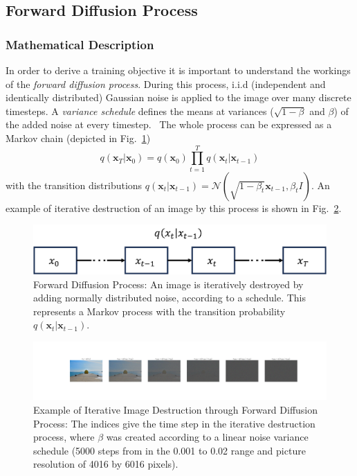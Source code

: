 \subsection{Forward Diffusion Process}
\subsubsection{Mathematical Description}
In order to derive a training objective it is important to understand the workings of the \textit{forward diffusion process}. During this process, i.i.d (independent and identically distributed) Gaussian noise is applied to the image over many discrete timesteps. A \textit{variance schedule} defines the means at variances ($\sqrt{1-\beta}$ and $\beta$) of the added noise at every timestep.~\autocite{ho2020denoising} The whole process can be expressed as a Markov chain (depicted in Fig.~\ref{fig:forward_diffusion})
\begin{equation}
    q(\bm{x}_T|\bm{x}_0) = q(\bm{x}_0) \prod_{t=1}^{T} q(\bm{x}_{t}|\bm{x}_{t-1})
\end{equation}
with the transition distributions $q(\bm{x}_t|\bm{x}_{t-1}) = \mathcal{N}(\sqrt{1-\beta_t} \bm{x}_{t-1}, \beta_t I)$. An example of iterative destruction of an image by this process is shown in Fig.~\ref{fig:forward_naoshima}.

\begin{figure}[h]
    \centering
    \includegraphics[width=.5\textwidth]{images/forward_diffusion.png}
    \caption{Forward Diffusion Process: An image is iteratively destroyed by adding normally distributed noise,
        according to a schedule. This represents a Markov process with the transition probability $q(\bm{x}_t|\bm{x}_{t-1})$.}
    \label{fig:forward_diffusion}
\end{figure}

\begin{figure}[h]
    \centering
    \includegraphics[width=\textwidth]{images/forward_naoshima.png}
    \caption{Example of Iterative Image Destruction through Forward Diffusion Process:
        The indices give the time step in the iterative destruction process, where $\beta$ was created according to a linear noise variance schedule (5000 steps from in the 0.001 to 0.02 range and picture resolution of 4016 by 6016 pixels).}
    \label{fig:forward_naoshima}
\end{figure}

